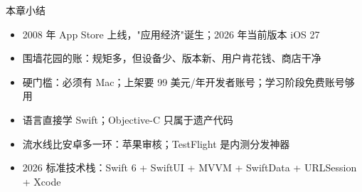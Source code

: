 \begin{tcbsummary}{本章小结}
\begin{itemize}
  \item 2008 年 App Store 上线，"应用经济"诞生；2026 年当前版本 iOS 27
  \item 围墙花园的账：规矩多，但设备少、版本新、用户肯花钱、商店干净
  \item 硬门槛：必须有 Mac；上架要 99 美元/年开发者账号；学习阶段免费账号够用
  \item 语言直接学 Swift；Objective-C 只属于遗产代码
  \item 流水线比安卓多一环：苹果审核；TestFlight 是内测分发神器
  \item 2026 标准技术栈：Swift 6 + SwiftUI + MVVM + SwiftData + URLSession + Xcode
\end{itemize}

\end{tcbsummary}
